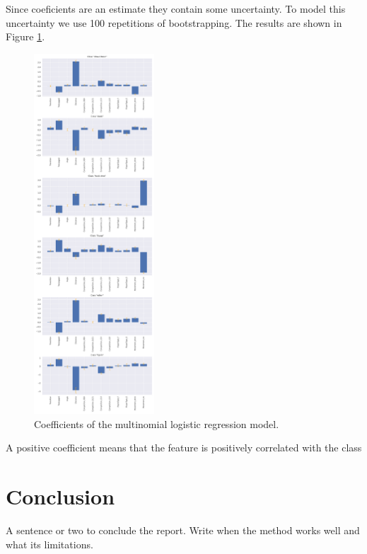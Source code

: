 \documentclass[9pt]{IEEEtran}
\begin{document}
Since coeficients are an estimate they contain some uncertainty.
To model this uncertainty we use 100 repetitions of bootstrapping.
The results are shown in Figure \ref{fig:coef}.
\begin{figure}
    \centering
    \includegraphics[width=0.4\textwidth]{coefficients.pdf}
    \caption{Coefficients of the multinomial logistic regression model.}
    \label{fig:coef}
\end{figure}
A positive coefficient means that the feature is positively correlated with the class


\section{Conclusion}

A sentence or two to conclude the report. Write when the method works well and what its limitations.



\end{document}
